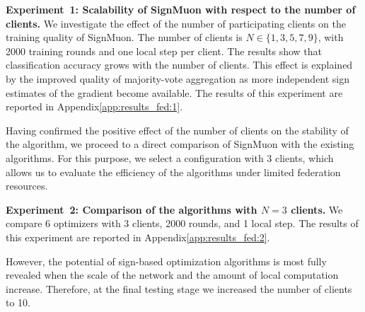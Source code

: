 \documentclass[letterpaper]{article} %
\begin{document}
\textbf{Experiment~1: Scalability of SignMuon with respect to the number of clients.} 
We investigate the effect of the number of participating clients on the training quality of SignMuon. The number of clients is $N \in \{1, 3, 5, 7, 9\}$, with 2000 training rounds and one local step per client. The results show that classification accuracy grows with the number of clients. This effect is explained by the improved quality of majority-vote aggregation as more independent sign estimates of the gradient become available. The results of this experiment are reported in Appendix\ref{app:results_fed:1}.

Having confirmed the positive effect of the number of clients on the stability of the algorithm, we proceed to a direct comparison of SignMuon with the existing algorithms. For this purpose, we select a configuration with 3 clients, which allows us to evaluate the efficiency of the algorithms under limited federation resources.

\textbf{Experiment~2: Comparison of the algorithms with $N=3$ clients.} We compare 6 optimizers with 3 clients, 2000 rounds, and 1 local step. The results of this experiment are reported in Appendix\ref{app:results_fed:2}.

However, the potential of sign-based optimization algorithms is most fully revealed when the scale of the network and the amount of local computation increase. Therefore, at the final testing stage we increased the number of clients to 10.
\end{document}
